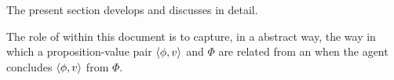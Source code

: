 




\section{}
\label{cha:var:ros}

\begin{note}
  The present section develops and discusses  in detail.

  The role of  within this document is to capture, in a abstract way, the way in which a proposition-value pair \(\langle \phi, v \rangle\) and \poP{} \(\Phi\) are related from an \agpe{} when the agent concludes \(\langle \phi, v \rangle\) from \(\Phi\).
\end{note}

